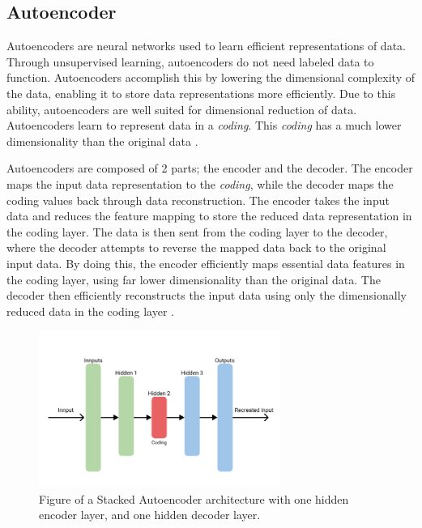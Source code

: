 
\subsection{Autoencoder}

Autoencoders are neural networks used to learn efficient representations of data.
Through unsupervised learning, autoencoders do not need labeled data to function.
Autoencoders accomplish this by lowering the dimensional complexity of the data, enabling it to store data representations more efficiently.
Due to this ability, autoencoders are well suited for dimensional reduction of data.
Autoencoders learn to represent data in a \textit{coding}.
This \textit{coding} has a much lower dimensionality than the original data
\cite[p.~506-508]{Geron2017}.

Autoencoders are composed of 2 parts; the encoder and the decoder.
The encoder maps the input data representation to the \textit{coding}, while the decoder maps the coding values back through data reconstruction.
The encoder takes the input data and reduces the feature mapping to store the reduced data representation in the coding layer.
The data is then sent from the coding layer to the decoder, where the decoder attempts to reverse the mapped data back to the original input data.
By doing this, the encoder efficiently maps essential data features in the coding layer, using far lower dimensionality than the original data.
The decoder then efficiently reconstructs the input data using only the dimensionally reduced data in the coding layer
\cite[p.~506-508]{Geron2017}.


\begin{figure}[h!]
    \centering
    \includegraphics[width=0.7\textwidth]{./sections/BT/figures/Autoencoder.png}
    \hfill
    \caption{Figure of a Stacked Autoencoder architecture with one hidden encoder layer, and one hidden decoder layer.}
    \label{fig:stacked_autoencoder_arch}
\end{figure}

